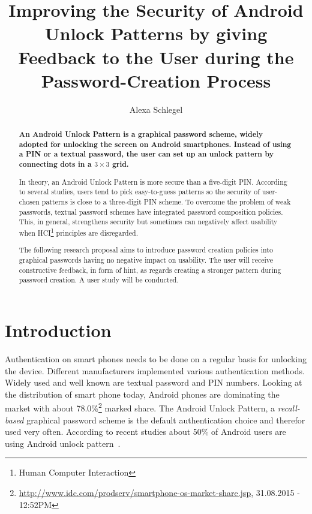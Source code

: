 \documentclass[twocolumn, a4paper, 10pt]{article}
\begin{document}
\title{
	Improving the Security of Android Unlock Patterns by giving Feedback to the User during the Password-Creation Process}

\author{
	Alexa Schlegel
}

\maketitle


\def\abstractname{{\textbf Abstract}}
\begin{abstract}
{
\bfseries
An Android Unlock Pattern is a graphical password scheme, widely adopted for unlocking the screen on Android smartphones. Instead of using a PIN or a textual password, the user can set up an unlock pattern by connecting dots in a $3\times3$ grid.

In theory, an Android Unlock Pattern is more secure than a five-digit PIN. According to several studies, users tend to pick easy-to-guess patterns so the security of user-chosen patterns is close to a three-digit PIN scheme. To overcome the problem of weak passwords, textual password schemes have integrated password composition policies. This, in general, strengthens security but sometimes can negatively affect usability when HCI\footnote{Human Computer Interaction} principles are disregarded.

The following research proposal aims to introduce password creation policies into graphical passwords having no negative impact on usability. The user will receive  constructive feedback, in form of hint, as regards creating a stronger pattern during password creation. A user study will be conducted.
}
\end{abstract}


\section{Introduction}
\label{sec:intro}

Authentication on smart phones needs to be done on a regular basis for unlocking the device. Different manufacturers implemented various authentication methods. Widely used and well known are textual password and PIN numbers. Looking at the distribution of smart phone today, Android phones are dominating the market with about 78.0\%\footnote{\url{http://www.idc.com/prodserv/smartphone-os-market-share.jsp}, 31.08.2015 - 12:52PM} marked share. The Android Unlock Pattern, a \textit{recall-based} graphical password scheme is the default authentication choice and therefor used very often. According to recent studies about 50\% of Android users are using Android unlock pattern~\cite{VanBruggen:2013:MSU:2501604.2501614, van2014studying}.
\end{document}
